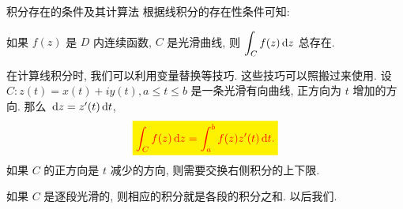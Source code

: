 \begin{frame}{积分存在的条件及其计算法}
\onslide<+->
根据线积分的存在性条件可知:
\begin{theorem}
如果 $f(z)$ 是 $D$ 内连续函数, $C$ 是光滑曲线, 则 $\displaystyle\int_Cf(z)\,\mathrm{d} z$ 总存在.
\end{theorem}
\onslide<+->
在计算线积分时, 我们可以利用变量替换等技巧.
\onslide<+->
这些技巧可以照搬过来使用.
\onslide<+->
设 $C:z(t)=x(t)+iy(t),a\le t\le b$ 是一条光滑有向曲线, 正方向为 $t$ 增加的方向.
\onslide<+->
那么 $\,\mathrm{d} z=z'(t)\,\mathrm{d} t$,
\onslide<+->
\[\eqatt{\int_Cf(z)\diff z=\int_a^b f(z)z'(t)\diff t.}\]
\onslide<+->
如果 $C$ 的正方向是 $t$ 减少的方向, 则需要交换右侧积分的上下限.

\onslide<+->
如果 $C$ 是逐段光滑的, 则相应的积分就是各段的积分之和.
\onslide<+->
以后我们.
\end{frame}


